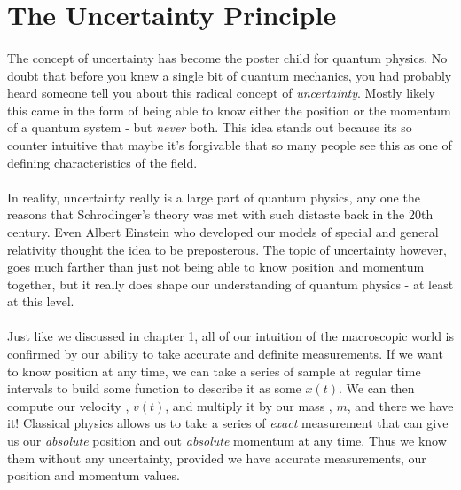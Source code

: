 \documentclass[12pt,letterpaper]{book}
\begin{document}

\section{The Uncertainty Principle}
\paragraph*{}The concept of uncertainty has become the poster child for quantum physics. No doubt that before you knew a single bit of quantum mechanics, you had probably heard someone tell you about this radical concept of \textit{uncertainty}. Mostly likely this came in the form of being able to know either the position or the momentum of a quantum system - but \textit{never} both. This idea stands out because its so counter intuitive that maybe it's forgivable that so many people see this as one of defining characteristics of the field.
\paragraph*{}In reality, uncertainty really is a large part of quantum physics, any one the reasons that Schrodinger's theory was met with such distaste back in the 20th century. Even Albert Einstein who developed our models of special and general relativity thought the idea to be preposterous. The topic of uncertainty however, goes much farther than just not being able to know position and momentum together, but it really does shape our understanding of quantum physics - at least at this level.
\paragraph*{}Just like we discussed in chapter 1, all of our intuition of the macroscopic world is confirmed by our ability to take accurate and definite measurements. If we want to know position at any time, we can take a series of sample at regular time intervals to build some function to describe it as some $x(t)$. We can then compute our velocity , $v(t)$, and multiply it by our mass , $m$, and there we have it! Classical physics allows us to take a series of \textit{exact} measurement that can give us our \textit{absolute} position and out \textit{absolute} momentum at any time. Thus we know them without any uncertainty, provided we have accurate measurements, our position and momentum values.
\end{document}
